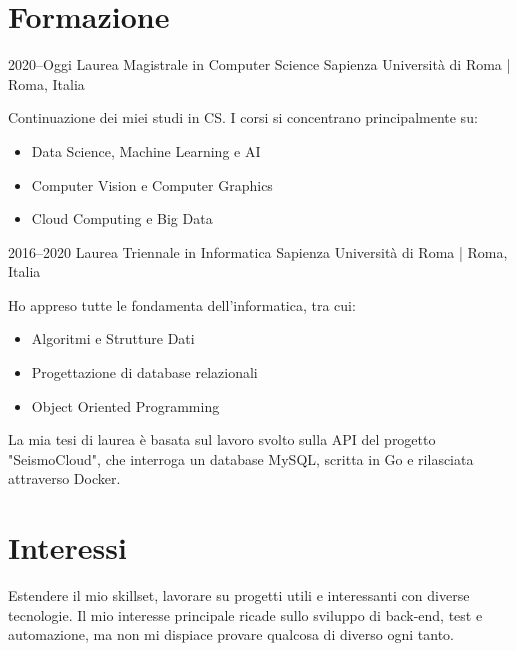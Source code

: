 \documentclass[]{cv-style}          %
\begin{document}

\section{Formazione}

\begin{entrylist}
\entry
{2020--Oggi}
{Laurea Magistrale in Computer Science}
{Sapienza Università di Roma | Roma, Italia}
{Continuazione dei miei studi in CS. I corsi si concentrano principalmente su:
\begin{itemize}
    \item Data Science, Machine Learning e AI
    \item Computer Vision e Computer Graphics
    \item Cloud Computing e Big Data
\end{itemize}
}
\entry
{2016--2020}
{Laurea Triennale in Informatica}
{Sapienza Università di Roma | Roma, Italia}
{Ho appreso tutte le fondamenta dell'informatica, tra cui:
\begin{itemize}
    \item Algoritmi e Strutture Dati
    \item Progettazione di database relazionali
    \item Object Oriented Programming
\end{itemize}
La mia tesi di laurea è basata sul lavoro svolto sulla API del progetto "SeismoCloud", che interroga un database MySQL, scritta in Go e rilasciata attraverso Docker.
}
\end{entrylist}


\section{Interessi}

\begin{entrylist}
\entry
{} %
{{\normalfont 
Estendere il mio skillset, lavorare su progetti utili e interessanti con diverse tecnologie. Il mio interesse principale ricade sullo sviluppo di back-end, test e automazione, ma non mi dispiace provare qualcosa di diverso ogni tanto.
}}
{}
{\vspace{-0.5cm}}
\end{entrylist}
\end{document}
